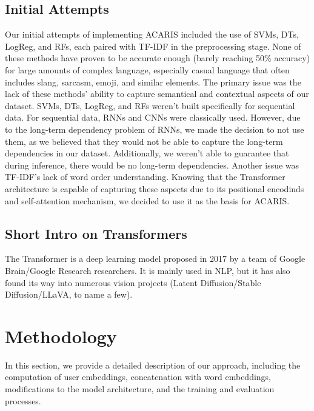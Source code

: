 \documentclass{article}
\begin{document}
\subsection{Initial Attempts}
Our initial attempts of implementing ACARIS included the use of SVMs, DTs, LogReg, and RFs, each paired with TF-IDF in the preprocessing stage. None of these methods have proven to be accurate enough (barely reaching 50\% accuracy) for large amounts of complex language, especially casual language that often includes slang, sarcasm, emoji, and similar elements. The primary issue was the lack of these methods' ability to capture semantical and contextual aspects of our dataset. SVMs, DTs, LogReg, and RFs weren't built specifically for sequential data. For sequential data, RNNs and CNNs were classically used. However, due to the long-term dependency problem of RNNs, we made the decision to not use them, as we believed that they would not be able to capture the long-term dependencies in our dataset. Additionally, we weren't able to guarantee that during inference, there would be no long-term dependencies.
Another issue was TF-IDF's lack of word order understanding. Knowing that the Transformer\cite{vaswani2017attention} architecture is capable of capturing these aspects due to its positional encodinds and self-attention mechanism, we decided to use it as the basis for ACARIS.

\subsection{Short Intro on Transformers}
The Transformer is a deep learning model proposed in 2017 by a team of Google Brain/Google Research researchers. It is mainly used in NLP, but it has also found its way into numerous vision projects (Latent Diffusion\cite{rombach2021highresolution}/Stable Diffusion/LLaVA\cite{liu2023visual}, to name a few).

\section{Methodology}
In this section, we provide a detailed description of our approach, including the computation of user embeddings, concatenation with word embeddings, modifications to the model architecture, and the training and evaluation processes.

\end{document}
